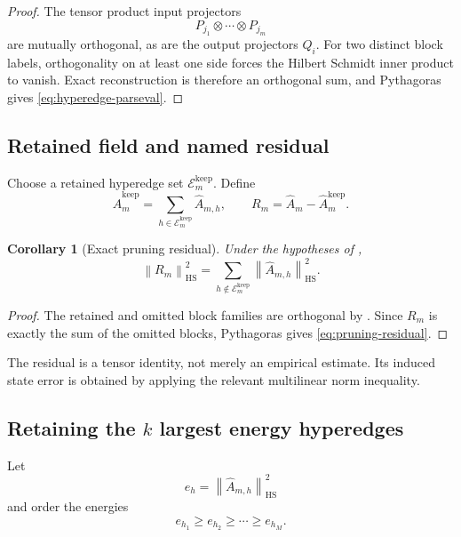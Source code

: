 \documentclass[11pt]{article}
\newtheorem{corollary}[theorem]{Corollary}
\theoremstyle{definition}
\theoremstyle{remark}
\newcommand{\cE}{\mathcal E}
\newcommand{\norm}[1]{\left\lVert #1\right\rVert}
\begin{document}
\begin{proof}
The tensor product input projectors
\[
  P_{j_1}\otimes\cdots\otimes P_{j_m}
\]
are mutually orthogonal, as are the output projectors $Q_i$.  For two distinct block labels, orthogonality on at least one side forces the Hilbert Schmidt inner product to vanish.  Exact reconstruction is therefore an orthogonal sum, and Pythagoras gives \eqref{eq:hyperedge-parseval}.
\end{proof}

\subsection{Retained field and named residual}
Choose a retained hyperedge set $\cE_m^{\mathrm{keep}}$.  Define
\begin{equation}\label{eq:pruned-tensor}
  \widehat A_m^{\mathrm{keep}}
  =
  \sum_{h\in\cE_m^{\mathrm{keep}}}
  \widehat A_{m,h},
  \qquad
  R_m
  =
  \widehat A_m-\widehat A_m^{\mathrm{keep}}.
\end{equation}

\begin{corollary}[Exact pruning residual]\label{cor:pruning-residual}
Under the hypotheses of ,
\begin{equation}\label{eq:pruning-residual}
  \boxed{
  \norm{R_m}_{\mathrm{HS}}^2
  =
  \sum_{h\notin\cE_m^{\mathrm{keep}}}
  \norm{\widehat A_{m,h}}_{\mathrm{HS}}^2.}
\end{equation}
\end{corollary}

\begin{proof}
The retained and omitted block families are orthogonal by .  Since $R_m$ is exactly the sum of the omitted blocks, Pythagoras gives \eqref{eq:pruning-residual}.
\end{proof}

The residual is a tensor identity, not merely an empirical estimate.  Its induced state error is obtained by applying the relevant multilinear norm inequality.

\subsection{\texorpdfstring{Retaining the $k$ largest energy hyperedges}{Retaining the k largest energy hyperedges}}
Let
\[
  e_h=\norm{\widehat A_{m,h}}_{\mathrm{HS}}^2
\]
and order the energies
\[
  e_{h_1}\geq e_{h_2}\geq\cdots\geq e_{h_M}.
\]
\end{document}
